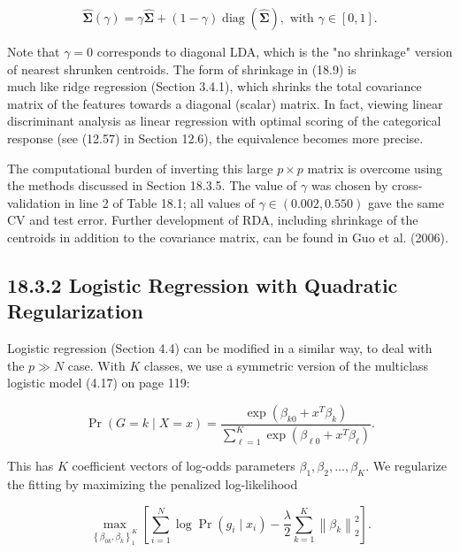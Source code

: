 \documentclass[10pt]{article}
\begin{document}
\begin{equation*}
\hat{\boldsymbol{\Sigma}}(\gamma)=\gamma \hat{\boldsymbol{\Sigma}}+(1-\gamma) \operatorname{diag}(\hat{\boldsymbol{\Sigma}}), \text { with } \gamma \in[0,1] . \tag{18.9}
\end{equation*}


Note that $\gamma=0$ corresponds to diagonal LDA, which is the "no shrinkage" version of nearest shrunken centroids. The form of shrinkage in (18.9) is\\
much like ridge regression (Section 3.4.1), which shrinks the total covariance matrix of the features towards a diagonal (scalar) matrix. In fact, viewing linear discriminant analysis as linear regression with optimal scoring of the categorical response (see (12.57) in Section 12.6), the equivalence becomes more precise.

The computational burden of inverting this large $p \times p$ matrix is overcome using the methods discussed in Section 18.3.5. The value of $\gamma$ was chosen by cross-validation in line 2 of Table 18.1; all values of $\gamma \in(0.002,0.550)$ gave the same CV and test error. Further development of RDA, including shrinkage of the centroids in addition to the covariance matrix, can be found in Guo et al. (2006).

\subsection*{18.3.2 Logistic Regression with Quadratic Regularization}
Logistic regression (Section 4.4) can be modified in a similar way, to deal with the $p \gg N$ case. With $K$ classes, we use a symmetric version of the multiclass logistic model (4.17) on page 119:


\begin{equation*}
\operatorname{Pr}(G=k \mid X=x)=\frac{\exp \left(\beta_{k 0}+x^{T} \beta_{k}\right)}{\sum_{\ell=1}^{K} \exp \left(\beta_{\ell 0}+x^{T} \beta_{\ell}\right)} . \tag{18.10}
\end{equation*}


This has $K$ coefficient vectors of log-odds parameters $\beta_{1}, \beta_{2}, \ldots, \beta_{K}$. We regularize the fitting by maximizing the penalized log-likelihood


\begin{equation*}
\max _{\left\{\beta_{0 k}, \beta_{k}\right\}_{1}^{K}}\left[\sum_{i=1}^{N} \log \operatorname{Pr}\left(g_{i} \mid x_{i}\right)-\frac{\lambda}{2} \sum_{k=1}^{K}\left\|\beta_{k}\right\|_{2}^{2}\right] . \tag{18.11}
\end{equation*}
\end{document}
